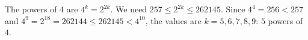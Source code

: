 The powers of $4$ are $4^k=2^{2k}$. We need $257\le 2^{2k}\le 262145$. Since $4^4=256<257$ and $4^9=2^{18}=262144\le262145<4^{10}$, the values are $k=5,6,7,8,9$: $\boxed{5}$ powers of $4$.
